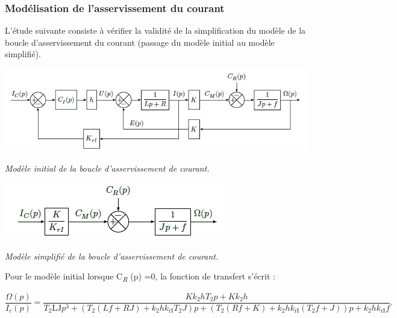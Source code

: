 \documentclass[10pt,fleqn]{article} %
\begin{document}
\begin{multicols}{2}
\subsubsection{Modélisation de l'asservissement du courant}

L'étude suivante consiste à vérifier la validité de la simplification du
modèle de la boucle d'asservissement du courant (passage du modèle initial au modèle simplifié).

\begin{center}
\includegraphics[width=1.0\linewidth]{images/image11.png}

\textit{Modèle initial de la boucle d'asservissement de courant. \label{fig10}}
\end{center}


\begin{center}
\includegraphics[width=\linewidth]{images/image12.png}

\textit{Modèle simplifié de la boucle d'asservissement de courant. \label{fig11}}
\end{center}


Pour le modèle initial
  lorsque C\emph{\textsubscript{R}} (p) =0, la fonction de transfert s'écrit :

\[\frac{\Omega(p)}{I_{c}(p)} = \frac{Kk_{2}hT_{2}p + Kk_{2}h}{T_{2}\text{LJ}p^{3} + \left( T_{2}\left( Lf + RJ \right) + k_{2}hk_{\text{rI}}T_{2}J \right)p + \left( T_{2}\left( Rf + K \right) + k_{2}hk_{\text{rI}}\left( T_{2}f + J \right) \right)p + k_{2}hk_{\text{rI}}f}.\]


\end{multicols}
\end{document}
